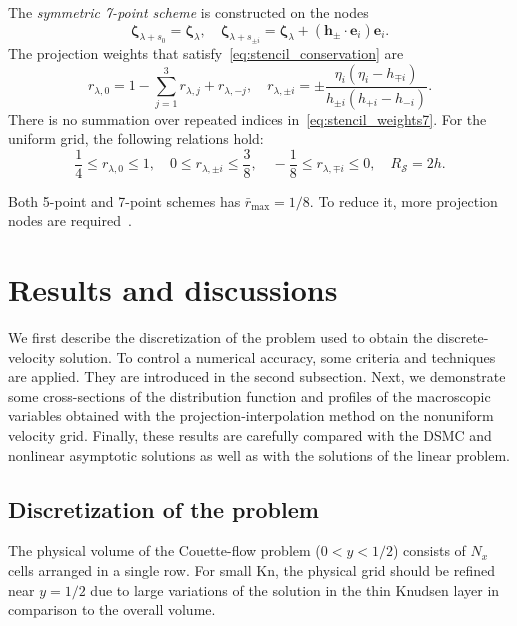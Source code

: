 \documentclass[]{elsarticle} %
\newcommand{\Kn}{\mathrm{Kn}}
\newcommand{\bzeta}{\boldsymbol{\zeta}}
\newcommand{\bh}{\boldsymbol{h}}
\newcommand{\be}{\boldsymbol{e}}
\begin{document}
The \emph{symmetric 7-point scheme} is constructed on the nodes
\begin{equation}\label{eq:stencil_nodes7}
    \bzeta_{\lambda+s_0} = \bzeta_{\lambda}, \quad
    \bzeta_{\lambda+s_{\pm i}} = \bzeta_{\lambda} + (\bh_\pm\cdot \be_i)\be_i.
\end{equation}
The projection weights that satisfy~\eqref{eq:stencil_conservation} are
\begin{equation}\label{eq:stencil_weights7}
    r_{\lambda,0} = 1 - \sum_{j=1}^3 r_{\lambda,j} + r_{\lambda,-j}, \quad
    r_{\lambda,\pm i} = \pm\frac{\eta_i(\eta_i - h_{\mp i})}{h_{\pm i}(h_{+i}-h_{-i})}.
\end{equation}
There is no summation over repeated indices in~\eqref{eq:stencil_weights7}.
For the uniform grid, the following relations hold:
\begin{equation}\label{eq:weights_ranges7}
    \frac14 \leq r_{\lambda,0} \leq 1, \quad
    0 \leq r_{\lambda,\pm i} \leq \frac38, \quad
    -\frac18 \leq r_{\lambda,\mp i} \leq 0, \quad
    R_\mathcal{S} = 2h.
\end{equation}

Both 5-point and 7-point schemes has \(\bar{r}_{\max}=1/8\).
To reduce it, more projection nodes are required~\citep{Dodulad2012}.

\section{Results and discussions}

We first describe the discretization of the problem used to obtain the discrete-velocity solution.
To control a numerical accuracy, some criteria and techniques are applied.
They are introduced in the second subsection.
Next, we demonstrate some cross-sections of the distribution function and
profiles of the macroscopic variables obtained with
the projection-interpolation method on the nonuniform velocity grid.
Finally, these results are carefully compared with the DSMC and nonlinear asymptotic solutions
as well as with the solutions of the linear problem.

\subsection{Discretization of the problem}

The physical volume of the Couette-flow problem (\(0<y<1/2\)) consists of \(N_x\) cells arranged in a single row.
For small \(\Kn\), the physical grid should be refined near \(y=1/2\)
due to large variations of the solution in the thin Knudsen layer in comparison to the overall volume.
\end{document}
